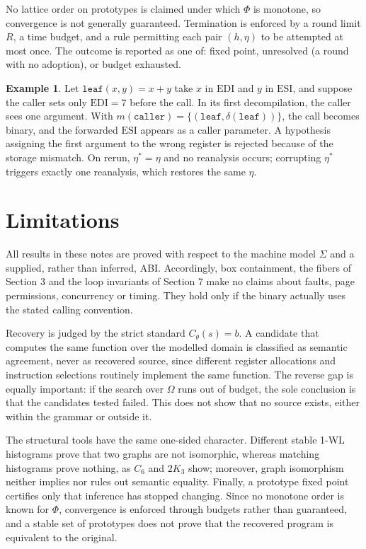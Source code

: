 \documentclass[11pt]{article}
\theoremstyle{definition}
\newtheorem{example}[theorem]{Example}
\theoremstyle{remark}
\begin{document}
No lattice order on prototypes is claimed under which $\Phi$ is monotone, so convergence is not generally guaranteed. Termination is enforced by a round limit $R$, a time budget, and a rule permitting each pair $(h, \eta)$ to be attempted at most once. The outcome is reported as one of: fixed point, unresolved (a round with no adoption), or budget exhausted.

\begin{example}
Let $\mathtt{leaf}(x,y) = x + y$ take $x$ in $\mathrm{EDI}$ and $y$ in $\mathrm{ESI}$, and suppose the caller sets only $\mathrm{EDI} = 7$ before the call. In its first decompilation, the caller sees one argument. With $m(\mathtt{caller}) = \{(\mathtt{leaf}, \delta(\mathtt{leaf}))\}$, the call becomes binary, and the forwarded $\mathrm{ESI}$ appears as a caller parameter. A hypothesis assigning the first argument to the wrong register is rejected because of the storage mismatch. On rerun, $\eta^\ast = \eta$ and no reanalysis occurs; corrupting $\eta^\ast$ triggers exactly one reanalysis, which restores the same $\eta$.
\end{example}

\section{Limitations}

All results in these notes are proved with respect to the machine model $\Sigma$ and a supplied, rather than inferred, ABI. Accordingly, box containment, the fibers of Section 3 and the loop invariants of Section 7 make no claims about faults, page permissions, concurrency or timing. They hold only if the binary actually uses the stated calling convention.

Recovery is judged by the strict standard $C_\theta(s) = b$. A candidate that computes the same function over the modelled domain is classified as semantic agreement, never as recovered source, since different register allocations and instruction selections routinely implement the same function. The reverse gap is equally important: if the search over $\Omega$ runs out of budget, the sole conclusion is that the candidates tested failed. This does not show that no source exists, either within the grammar or outside it.

The structural tools have the same one-sided character. Different stable 1-WL histograms prove that two graphs are not isomorphic, whereas matching histograms prove nothing, as $C_6$ and $2K_3$ show; moreover, graph isomorphism neither implies nor rules out semantic equality. Finally, a prototype fixed point certifies only that inference has stopped changing. Since no monotone order is known for $\Phi$, convergence is enforced through budgets rather than guaranteed, and a stable set of prototypes does not prove that the recovered program is equivalent to the original.
\end{document}
